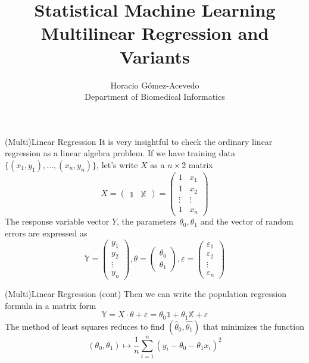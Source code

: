 \documentclass{beamer}
\title{Statistical Machine Learning\\ Multilinear Regression and Variants }
\author{Horacio G\'omez-Acevedo\\ Department of Biomedical Informatics}
\begin{document}
\begin{frame}[plain]
		\maketitle	
\end{frame}
\begin{frame}{(Multi)Linear Regression }
		It is very insightful to check the ordinary linear regression as a
		linear algebra problem.
		If we have training data \(\{ (x_1,y_1),\ldots,(x_n,y_n)\}\), let's
		write \(X\) as a \(n\times 2\) matrix 
		\begin{equation*}
		X= \begin{pmatrix}
			\mathbb{1} & \mathbb{X }
		\end{pmatrix}=
		\begin{pmatrix}
			1 & x_1\\
			1 & x_2 \\
		   	\vdots & \vdots \\
			1 & x_n 
		\end{pmatrix}
		\end{equation*} The response variable vector \(Y\), the parameters
		\(\theta_0, \theta_1\) and the vector of random errors are expressed as
		\begin{equation*}
		\mathbb{Y}=
		\begin{pmatrix}
			y_1\\
			y_2\\
			\vdots\\
			y_n
		\end{pmatrix},
		\theta= 
		\begin{pmatrix}
			\theta_0 \\
			\theta_1
		\end{pmatrix}, 
		\varepsilon= 
		\begin{pmatrix}
			\varepsilon_1\\
			\varepsilon_2\\
			\vdots\\
			\varepsilon_n
		\end{pmatrix}
		\end{equation*} 
	\end{frame}

\begin{frame}{(Multi)Linear Regression (cont)}
	Then we can write the population regression formula in a matrix form
\begin{equation}
	\mathbb{Y}=X \cdot \theta + \varepsilon=\theta_0 \mathbb{1}+ \theta_1 \mathbb{X}+ \varepsilon
\end{equation}
The method of least squares reduces to find $(\hat{\theta}_0,\hat{\theta_1})$ that minimizes the function
	\begin{equation*}
		(\theta_0,\theta_1)\mapsto \frac{1}{n}\sum_{i=1}^n (y_i- \theta_0-\theta_1 x_i)^2
	\end{equation*}
\end{frame}
\end{document}
